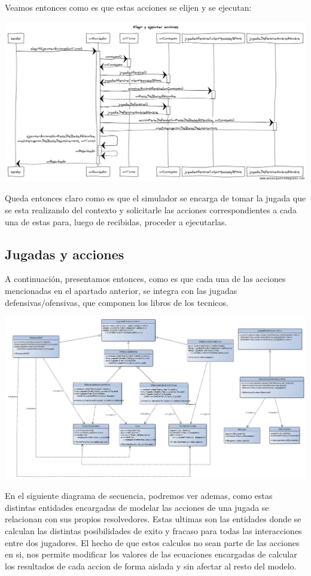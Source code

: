 Veamos entonces como es que estas acciones se elijen y se ejecutan:
\begin{center}
\includegraphics[scale=0.35]{diseno/Elegir_y_ejecutar_acciones.png}
\end{center}
Queda entonces claro como es que el simulador se encarga de tomar la jugada que se esta realizando del contexto y solicitarle las acciones correspondientes a cada una de estas para, luego de recibidas, proceder a ejecutarlas.

\subsection{Jugadas y acciones}
A continuación, presentamos entonces, como es que cada una de las acciones mencionadas en el apartado anterior, se integra con las jugadas defensivas/ofensivas, que componen los libros de los tecnicos.
\begin{center}
\includegraphics[scale=0.4, angle=90]{diseno/jugadasYAcciones.jpg}
\end{center}

En el siguiente diagrama de secuencia, podremos ver ademas, como estas distintas entidades encargadas de modelar las acciones de una jugada se relacionan con sus propios resolvedores. Estas ultimas son las entidades donde se calculan las distintas posibilidades de exito y fracaso para todas las interacciones entre dos jugadores. El hecho de que estos calculos no sean parte de las acciones en si, nos permite modificar los valores de las ecuaciones encargadas de calcular los resultados de cada accion de forma aislada y sin afectar al resto del modelo.


